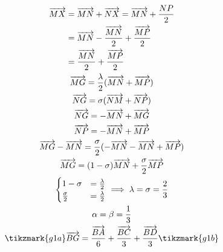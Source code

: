 \documentclass[brazilian, fleqn]{article}
\renewcommand{\vec}[1]{\overrightarrow{#1}}
\begin{document}
\begin{gather}
    \begin{aligned}[t]
        \vec{MX}&=\vec{MN}+\vec{NX}=\vec{MN}+\frac{NP}{2}\\
                &=\vec{MN}-\frac{\vec{MN}}{2}+\frac{\vec{MP}}{2} \\
                &=\frac{\vec{MN}}{2}+\frac{\vec{MP}}{2}
    \end{aligned} \\
    \vec{MG}=\frac{\lambda}{2}(\vec{MN}+\vec{MP})\\
    \vec{NG}=\sigma (\vec{NM}+\vec{NP}) \\
    \vec{NG}=-\vec{MN}+\vec{MG}\\
    \vec{NP}=-\vec{MN}+\vec{MP}\\
    \vec{MG}-\vec{MN}=\frac{\sigma}{2}(-\vec{MN}-\vec{MN}+\vec{MP})\\
    \vec{MG}=(1-\sigma)\vec{MN}+\frac{\sigma}{2}\vec{MP} \\
    \begin{cases}
        1-\sigma &= \frac{\lambda}{2}\\
        \frac{\sigma}{2}&=\frac{\lambda}{2}
    \end{cases} \implies
    \lambda = \sigma = \frac{2}{3}\\
    \alpha = \beta = \frac{1}{3} \\
    \tikzmark{g1a} \vec{BG}=\frac{\vec{BA}}{6}+\frac{\vec{BC}}{3}+\frac{\vec{BD}}{3} \tikzmark{g1b}
\end{gather}
\end{document}
